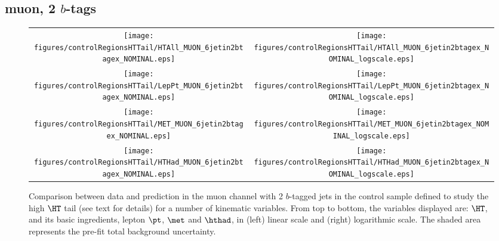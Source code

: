 \clearpage
\subsection{muon, 2 $b$-tags}
\label{sec:MUON_controlHTTail_2tagex}

\begin{figure}[htbp]
\begin{center}
\begin{tabular}{cc}
%
\texttt{[image: figures/controlRegionsHTTail/HTAll\_MUON\_6jetin2btagex\_NOMINAL.eps]} &
\texttt{[image: figures/controlRegionsHTTail/HTAll\_MUON\_6jetin2btagex\_NOMINAL\_logscale.eps]} \\
\texttt{[image: figures/controlRegionsHTTail/LepPt\_MUON\_6jetin2btagex\_NOMINAL.eps]} &
\texttt{[image: figures/controlRegionsHTTail/LepPt\_MUON\_6jetin2btagex\_NOMINAL\_logscale.eps]} \\
\texttt{[image: figures/controlRegionsHTTail/MET\_MUON\_6jetin2btagex\_NOMINAL.eps]} &
\texttt{[image: figures/controlRegionsHTTail/MET\_MUON\_6jetin2btagex\_NOMINAL\_logscale.eps]} \\
\texttt{[image: figures/controlRegionsHTTail/HTHad\_MUON\_6jetin2btagex\_NOMINAL.eps]} &
\texttt{[image: figures/controlRegionsHTTail/HTHad\_MUON\_6jetin2btagex\_NOMINAL\_logscale.eps]} \\

\end{tabular}\caption{\small {Comparison between data and prediction in the muon channel with 2 $b$-tagged jets in the control sample
defined to study the high $\HT$ tail (see text for details)  for a number of kinematic
variables. From top to bottom, the variables displayed are: $\HT$, and its basic ingredients, lepton $\pt$, $\met$ and $\hthad$,
in (left) linear scale and (right) logarithmic scale.
The shaded area represents the pre-fit total background uncertainty.}}
\label{fig:MUON_controlHTTail_2btagex_1}
\end{center}
\end{figure}
